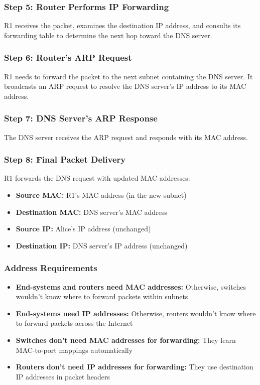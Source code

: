 \documentclass[../../compsys.tex]{subfiles}
\begin{document}
\subsubsection{Step 5: Router Performs IP Forwarding}
R1 receives the packet, examines the destination IP address, and consults its forwarding table to determine the next hop toward the DNS server.

\subsubsection{Step 6: Router's ARP Request}
R1 needs to forward the packet to the next subnet containing the DNS server. It broadcasts an ARP request to resolve the DNS server's IP address to its MAC address.

\subsubsection{Step 7: DNS Server's ARP Response}
The DNS server receives the ARP request and responds with its MAC address.

\subsubsection{Step 8: Final Packet Delivery}
R1 forwards the DNS request with updated MAC addresses:
\begin{itemize}
    \item \textbf{Source MAC:} R1's MAC address (in the new subnet)
    \item \textbf{Destination MAC:} DNS server's MAC address
    \item \textbf{Source IP:} Alice's IP address (unchanged)
    \item \textbf{Destination IP:} DNS server's IP address (unchanged)
\end{itemize}

\subsubsection{Address Requirements}
\begin{itemize}
    \item \textbf{End-systems and routers need MAC addresses:} Otherwise, switches wouldn't know where to forward packets within subnets
    \item \textbf{End-systems need IP addresses:} Otherwise, routers wouldn't know where to forward packets across the Internet
    \item \textbf{Switches don't need MAC addresses for forwarding:} They learn MAC-to-port mappings automatically
    \item \textbf{Routers don't need IP addresses for forwarding:} They use destination IP addresses in packet headers
\end{itemize}
\end{document}
